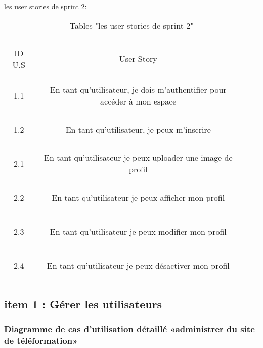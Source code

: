 
\begin{table}[h]
{\Large \color{cyan} les user stories de sprint 2:}\\
	
	\begin{center}
		\begin{tabular}{>{\begin{bf} } c <{\end{bf}}ccc}
			
			\rowcolor{-blue!20!red}ID U.S & \begin{bf}User Story \end{bf}  & \\
			
			
			1.1  & En tant qu’utilisateur, je dois m’authentifier pour accéder à mon espace \\& \\
		1.2  & En tant qu’utilisateur, je peux m’inscrire \\& \\
			2.1 & En tant qu’utilisateur je peux uploader une image de profil \\& \\
			2.2  & En tant qu’utilisateur je peux afficher mon profil \\& \\
			2.3  & En tant qu’utilisateur je peux modifier mon profil \\& \\
			2.4 & En tant qu’utilisateur je peux désactiver mon profil \\
			
			
		\end{tabular}
	\end{center}
	\caption{Tables  "les user stories de sprint 2"}
	\label{les user stories de sprint 2}
\end{table}



\clearpage


 
\subsection{item 1 : Gérer les utilisateurs}
\subsubsection{Diagramme de cas d’utilisation  détaillé «administrer du site de téléformation» }

